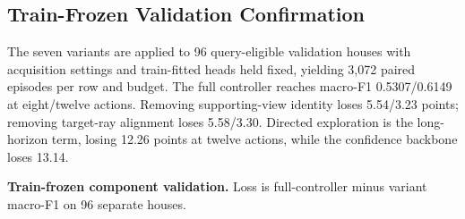 \documentclass{article}
\begin{document}


\subsection{Train-Frozen Validation Confirmation}
The seven variants are applied to 96 query-eligible validation houses with acquisition settings and train-fitted heads held fixed, yielding 3,072 paired episodes per row and budget. The full controller reaches macro-F1 0.5307/0.6149 at eight/twelve actions. Removing supporting-view identity loses 5.54/3.23 points; removing target-ray alignment loses 5.58/3.30. Directed exploration is the long-horizon term, losing 12.26 points at twelve actions, while the confidence backbone loses 13.14.

\begin{table}[H]
  \centering
  \caption{\textbf{Train-frozen component validation.} Loss is full-controller minus variant macro-F1 on 96 separate houses.}
  \label{tab:component-validation}
  \scriptsize
  \begin{adjustbox}{max width=\linewidth,max height=0.5\textheight}
    
  \end{adjustbox}
\end{table}

\end{document}
